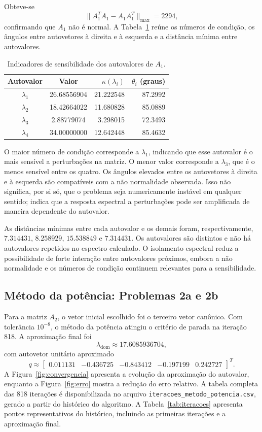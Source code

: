 Obteve-se
\[
\|A_1^TA_1-A_1A_1^T\|_{\max}=2294,
\]
confirmando que \(A_1\) não é normal. A Tabela~\ref{tab:sensibilidade} reúne os números de condição, os ângulos entre autovetores à direita e à esquerda e a distância mínima entre autovalores.

\begin{table}[H]
\centering
\caption{Indicadores de sensibilidade dos autovalores de \(A_1\).}
\label{tab:sensibilidade}
\begin{tabular}{ccrr}
\toprule
Autovalor & Valor & \(\kappa(\lambda_i)\) & \(\theta_i\) (graus)\\
\midrule
\(\lambda_1\)&26.68556904&21.222548&87.2992\\
\(\lambda_2\)&18.42664022&11.680828&85.0889\\
\(\lambda_3\)&2.88779074&3.298015&72.3493\\
\(\lambda_4\)&34.00000000&12.642448&85.4632\\
\bottomrule
\end{tabular}
\end{table}

O maior número de condição corresponde a \(\lambda_1\), indicando que esse autovalor é o mais sensível a perturbações na matriz. O menor valor corresponde a \(\lambda_3\), que é o menos sensível entre os quatro. Os ângulos elevados entre os autovetores à direita e à esquerda são compatíveis com a não normalidade observada. Isso não significa, por si só, que o problema seja numericamente instável em qualquer sentido; indica que a resposta espectral a perturbações pode ser amplificada de maneira dependente do autovalor.

As distâncias mínimas entre cada autovalor e os demais foram, respectivamente, \(7.314431\), \(8.258929\), \(15.538849\) e \(7.314431\). Os autovalores são distintos e não há autovalores repetidos no espectro calculado. O isolamento espectral reduz a possibilidade de forte interação entre autovalores próximos, embora a não normalidade e os números de condição continuem relevantes para a sensibilidade.

\subsection{Método da potência: Problemas 2a e 2b}

Para a matriz \(A_2\), o vetor inicial escolhido foi o terceiro vetor canônico. Com tolerância \(10^{-8}\), o método da potência atingiu o critério de parada na iteração 818. A aproximação final foi
\[
\boxed{\lambda_{\mathrm{dom}}\approx17.6085936704,}
\]
com autovetor unitário aproximado
\[
q\approx
\begin{bmatrix}
0.011131&-0.436725&-0.843412&-0.197199&0.242727
\end{bmatrix}^{T}.
\]
A Figura~\ref{fig:convergencia} apresenta a evolução da aproximação do autovalor, enquanto a Figura~\ref{fig:erro} mostra a redução do erro relativo. A tabela completa das 818 iterações é disponibilizada no arquivo \nolinkurl{iteracoes_metodo_potencia.csv}, gerado a partir do histórico do algoritmo. A Tabela~\ref{tab:iteracoes} apresenta pontos representativos do histórico, incluindo as primeiras iterações e a aproximação final.

